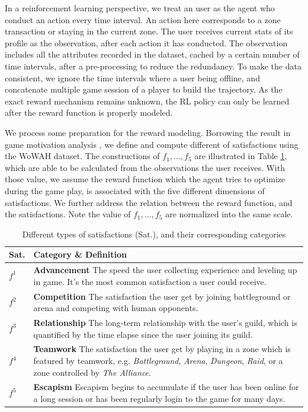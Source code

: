 \documentclass{sigchi}
\begin{document}
In a reinforcement learning perspective, we treat an user as the agent who conduct an action every time interval.
An action here corresponds to a zone transaction or staying in the current zone.
The user receives current stats of its profile as the observation, after each action it has conducted.
The observation includes all the attributes recorded in the dataset, cached by a certain number of time intervals, after a pre-processing to reduce the redundancy.
To make the data consistent, we ignore the time intervals where a user being offline, and concatenate multiple game session of a player to build the trajectory.
As the exact reward mechanism remains unknown, the RL policy can only be learned after the reward function is properly modeled.

We process some preparation for the reward modeling.
Borrowing the result in game motivation analysis \cite{yee2006motivations}, we define and compute different of satisfactions using the WoWAH dataset.
The constructions of $f_1,\dots, f_5$ are illustrated in Table \ref{tbl:satisfactions}, which are able to be calculated from the observations the user receives.
With those value, we assume the reward function which the agent tries to optimize during the game play, is associated with the five different dimensions of satisfactions.
We further address the relation between the reward function, and the satisfactions.
Note the value of $f_1,\dots, f_5$ are normalized into the same scale.

\begin{table}
\caption{Different types of satisfactions (Sat.), and their corresponding categories}
\begin{tabularx}{\textwidth}{lX}
    Sat. & \textbf{Category} \& Definition \\
    \midrule
    $f^1$ & \textbf{Advancement} The speed the user collecting experience and leveling up in game. It's the most common satisfaction a user could receive. \\
    $f^2$ & \textbf{Competition} The satisfaction the user get by joining battleground or arena and competing with human opponents. \\
    $f^3$ & \textbf{Relationship} The long-term relationship with the user's guild, which is quantified by the time elapse since the user joining its guild. \\
    $f^4$ & \textbf{Teamwork} The satisfaction the user get by playing in a zone which is featured by teamwork, e.g. \textit{Battleground}, \textit{Arena}, \textit{Dungeon}, \textit{Raid}, or a zone controlled by \textit{The Alliance}. \\
    $f^5$ & \textbf{Escapism} Escapism begins to accumulate if the user has been online for a long session or has been regularly login to the game for many days.
    \label{tbl:satisfactions}
\end{tabularx}
\end{table}
\end{document}
